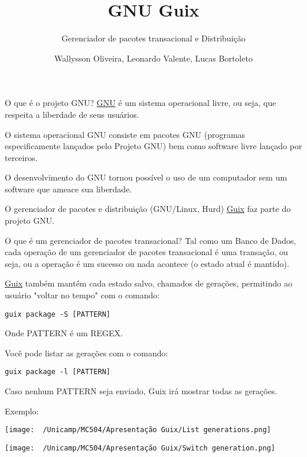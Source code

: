 \documentclass[bigger]{beamer}
\author{Wallysson Oliveira, Leonardo Valente, Lucas Bortoleto}
\date{}
\title{GNU Guix}
\subtitle{Gerenciador de pacotes transacional e Distribuição}
\begin{document}
\maketitle
\begin{frame}[label={sec:org1ab6533}]{O que é o projeto GNU?}
\href{https://www.gnu.org/home.en.html}{GNU} é um sistema operacional livre, ou seja, que respeita a liberdade de seus usuários.

O sistema operacional GNU consiste em pacotes GNU (programas especificamente lançados pelo Projeto GNU)
bem como software livre lançado por terceiros.

O desenvolvimento do GNU tornou possível o uso de um computador sem um software que ameace sua liberdade.

O gerenciador de pacotes e distribuição (GNU/Linux, Hurd) \href{https://guix.gnu.org/}{Guix} faz parte do projeto GNU.
\end{frame}
\begin{frame}[label={sec:org3b6ca69},fragile]{O que é um gerenciador de pacotes transacional?}
 Tal como um Banco de Dados, cada operação de um gerenciador de pacotes transacional é uma transação, ou seja,
ou a operação é um sucesso ou nada acontece (o estado atual é mantido).

\href{https://guix.gnu.org/manual/en/html\_node/Package-Management.html}{Guix} também mantém cada estado salvo, chamados de gerações, permitindo ao usuário "voltar no tempo" com
o comando:
\begin{verbatim}
guix package -S [PATTERN]
\end{verbatim}
Onde PATTERN é um REGEX.

Você pode listar as gerações com o comando:
\begin{verbatim}
guix package -l [PATTERN]
\end{verbatim}
Caso nenhum PATTERN seja enviado, Guix irá mostrar todas as gerações.
\end{frame}
\begin{frame}[label={sec:orge490e68}]{Exemplo:}
\begin{minipage}[c]{0.45\textwidth}
  \texttt{[image: ~/Unicamp/MC504/Apresentação Guix/List generations.png]}
\end{minipage}%
\hfill
\begin{minipage}[c]{0.45\textwidth}
  \texttt{[image: ~/Unicamp/MC504/Apresentação Guix/Switch generation.png]}
\end{minipage}
\end{frame}
\end{document}
